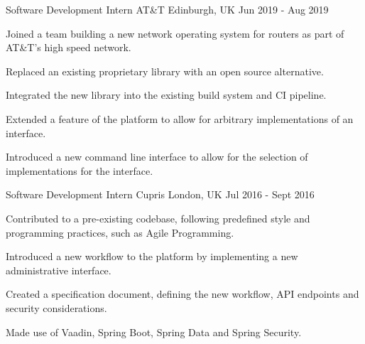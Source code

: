 

\begin{cventries}

  \cventry
    {Software Development Intern}
    {AT\&T}
    {Edinburgh, UK}
    {Jun 2019 - Aug 2019}
    {
	\begin{cvitems}
	    \item {Joined a team building a new network operating system for routers as part of AT\&T's high speed network.}
	    \item {Replaced an existing proprietary library with an open source alternative.}
	    \item {Integrated the new library into the existing build system and CI pipeline.}
	    \item {Extended a feature of the platform to allow for arbitrary implementations of an interface.}
	    \item {Introduced a new command line interface to allow for the selection of implementations for the interface.}
	\end{cvitems}
    }

  \cventry
    {Software Development Intern} %
    {Cupris} %
    {London, UK} %
    {Jul 2016 - Sept 2016} %
    {
      \begin{cvitems} %
        \item {Contributed to a pre-existing codebase, following predefined style and programming practices, such as Agile Programming.}
        \item {Introduced a new workflow to the platform by implementing a new administrative interface.}
        \item {Created a specification document, defining the new workflow, API endpoints and security considerations.}
	\item {Made use of Vaadin, Spring Boot, Spring Data and Spring Security.}
      \end{cvitems}
    }


\end{cventries}
